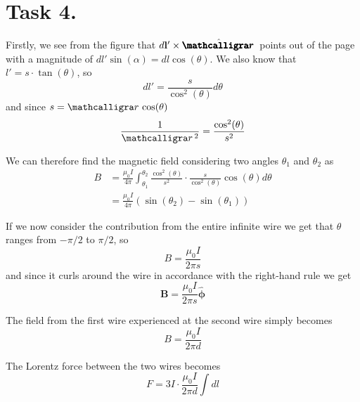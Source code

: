 \documentclass[a4paper,11pt]{article}
\begin{document}
\section*{Task 4.}
\begin{alphalist}
    \item Firstly, we see from the figure that $d\mathbf{l'} \times \hat{\boldscriptr}$ points out of the page with a magnitude of 
        $dl' \sin(\alpha) = dl \cos(\theta)$. We also know that $l' = s \cdot \tan(\theta)$, so
        \[
            dl' = \frac{s}{\cos^2(\theta)} d\theta
        \]
        and since $s = \scriptr \cos(\theta)$
        \[
            \frac{1}{\scriptr^2} = \frac{\cos^2(\theta)}{s^2}
        \]
        
        We can therefore find the magnetic field considering two angles $\theta_1$ and $\theta_2$ as
        \begin{align*}
            B &= \frac{\mu_0 I}{4\pi} \int_{\theta_1}^{\theta_2} \frac{\cos^2(\theta)}{s^2} \cdot \frac{s}{\cos^2(\theta)} \cos(\theta) d\theta \\
              &= \frac{\mu_0 I}{4\pi} \left(\sin(\theta_2) - \sin(\theta_1)\right)         
        \end{align*}

        If we now consider the contribution from the entire infinite wire we get that $\theta$ ranges from $-\pi/2$ to $\pi/2$, so
        \[
            B = \frac{\mu_0 I}{2\pi s}
        \]
        and since it curls around the wire in accordance with the right-hand rule we get
        \[
            \mathbf{B} = \frac{\mu_0 I}{2\pi s} \hat{\mathbf{\phi}}
        \]

    \item The field from the first wire experienced at the second wire simply becomes
        \[
            B = \frac{\mu_0 I}{2\pi d}
        \]

    \item The Lorentz force between the two wires becomes 
        \[
            F = 3I \cdot \frac{\mu_0 I}{2\pi d} \int dl
        \]
\end{alphalist}
\end{document}
